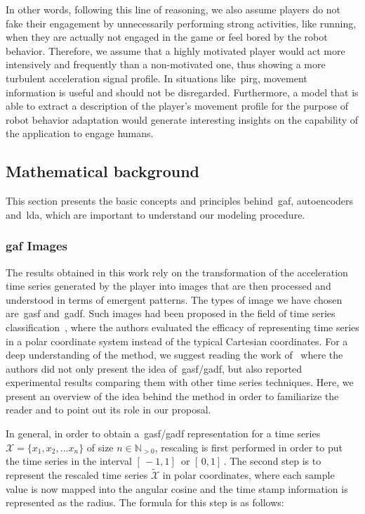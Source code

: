 In other words, following this line of reasoning, we also assume players do not fake their engagement by unnecessarily performing strong activities, like running, when they are actually not engaged in the game or feel bored by the robot behavior. Therefore, we assume that a highly motivated player would act more intensively and frequently than a non-motivated one, thus showing a more turbulent acceleration signal profile. In situations like~\gls{pirg}, movement information is useful and should not be disregarded. Furthermore, a model that is able to extract a description of the player's movement profile for the purpose of robot behavior adaptation would generate interesting insights on the capability of the application to engage humans.

\subsection{Mathematical background}
This section presents the basic concepts and principles behind~\gls{gaf}, autoencoders and~\gls{lda}, which are important to understand our modeling procedure.

\subsubsection{\glsdesc{gaf} Images}

The results obtained in this work rely on the transformation of the acceleration time series generated by the player into images that are then processed and understood in terms of emergent patterns. The types of image we have chosen are~\acrfull{gasf} and~\gls{gadf}. Such images had been proposed in the field of time series classification~\citep{wang_imaging_2015}, where the authors evaluated the efficacy of representing time series in a polar coordinate system instead of the typical Cartesian coordinates. For a deep understanding of the method, we suggest reading the work of~\cite{wang_imaging_2015} where the authors did not only present the idea of~\gls{gasf}/\gls{gadf}, but also reported experimental results comparing them with other time series techniques. Here, we present an overview of the idea behind the method in order to familiarize the reader and to point out its role in our proposal.

In general, in order to obtain a~\gls{gasf}/\gls{gadf} representation for a time series $\mathcal{X}=\{x_{1}, x_{2}, ... x_{n}\}$ of size $n \in \mathbb{N}_{>0}$, rescaling is first performed in order to put the time series in the interval $[\,-1,1] \,$ or $[\,0,1]\,$. The second step is to represent the rescaled time series $\widetilde{\mathcal{X}}$ in polar coordinates, where each sample value is now mapped into the angular cosine and the time stamp information is represented as the radius. 
The formula for this step is as follows:

